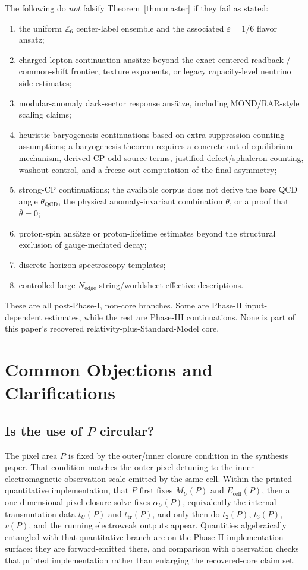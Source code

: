 \documentclass[11pt]{article}
\begin{document}
The following do \emph{not} falsify Theorem~\ref{thm:master} if they fail as stated:
\begin{enumerate}[leftmargin=2em]
\item the uniform $\mathbb Z_6$ center-label ensemble and the associated $\varepsilon=1/6$ flavor ansatz;
\item charged-lepton continuation ans\"atze beyond the exact centered-readback / common-shift frontier, texture exponents, or legacy capacity-level neutrino side estimates;
\item modular-anomaly dark-sector response ans\"atze, including MOND/RAR-style scaling claims;
\item heuristic baryogenesis continuations based on extra suppression-counting assumptions; a baryogenesis theorem requires a concrete out-of-equilibrium mechanism, derived CP-odd source terms, justified defect/sphaleron counting, washout control, and a freeze-out computation of the final asymmetry;
\item strong-CP continuations; the available corpus does not derive the bare QCD angle \(\theta_{\mathrm{QCD}}\), the physical anomaly-invariant combination \(\bar\theta\), or a proof that \(\bar\theta=0\);
\item proton-spin ans\"atze or proton-lifetime estimates beyond the structural exclusion of gauge-mediated decay;
\item discrete-horizon spectroscopy templates;
\item controlled large-$N_{\mathrm{edge}}$ string/worldsheet effective descriptions.
\end{enumerate}
These are all post-Phase-I, non-core branches. Some are Phase-II input-dependent estimates, while the rest are Phase-III continuations. None is part of this paper's recovered relativity-plus-Standard-Model core.

\section{Common Objections and Clarifications}

\subsection{\texorpdfstring{Is the use of $P$ circular?}{Is the use of P circular?}}

The pixel area \(P\) is fixed by the outer/inner closure condition in the synthesis paper. That
condition matches the outer pixel detuning to the inner electromagnetic observation scale emitted
by the same cell. Within the printed quantitative implementation, that \(P\) first fixes \(M_U(P)\) and \(E_{\mathrm{cell}}(P)\), then a
one-dimensional pixel-closure solve fixes \(\alpha_U(P)\), equivalently the internal transmutation
data \(t_U(P)\) and \(t_{\mathrm{tr}}(P)\), and only then do \(t_2(P)\), \(t_3(P)\), \(v(P)\), and
the running electroweak outputs appear. Quantities algebraically entangled with that quantitative
branch are on the Phase-II implementation surface: they are forward-emitted there, and
comparison with observation checks that printed implementation rather than enlarging the
recovered-core claim set.
\end{document}
